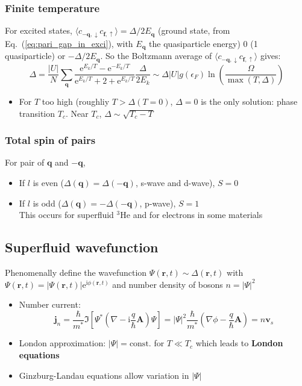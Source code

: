 \documentclass[11pt,letterpaper]{article}
\numberwithin{equation}{section} %
\renewcommand*{\vec}[1]{\bm{#1}}
\newcommand\mi{\mathrm{i}}
\newcommand\e{\mathrm{e}}
\newcommand{\spind}{\ensuremath{\downarrow}}
\newcommand{\spinu}{\ensuremath{\uparrow}}
\begin{document}
\subsubsection{Finite temperature}
\label{ssub:Finite_temperature}
For excited states, $\langle c_{-\vec q,\spind} c_{\vec f,\spinu}\rangle =
\Delta/2E_{\vec q}$ (ground state, from Eq.~(\ref{eq:pari_gap_in_exci}), with
$E_{\vec q}$ the quasiparticle energy) $0$ (1 quasiparticle) or
$-\Delta/2E_{\vec q}$. So the Boltzmann average of $\langle c_{-\vec
q,\spind} c_{\vec f,\spinu}\rangle$ gives: 
\begin{equation}
	\Delta = \frac{|U|}{N}\sum_{\vec q}
	\frac{\e^{E_k/T}-\e^{-E_k/T}}{\e^{E_k/T}+2+\e^{E_k/T}}
	\frac{\Delta}{2E_k}
	\sim \Delta |U|g(\epsilon_F)\ln \left( \frac{\Omega}{\max (T,\Delta)} \right)
\end{equation}
\begin{itemize}
	\item For $T$ too high (roughliy $T>\Delta(T=0)$, $\Delta=0$ is the only
		solution: phase transition $T_c$. Near $T_c$, $\Delta\sim\sqrt{T_c -
		T}$
\end{itemize}

\subsubsection{Total spin of pairs}
\label{ssub:Total_spin_of_pairs}
For pair of $\vec q$ and $-\vec q$, 
\begin{itemize}
	\item If $l$ is even ($\Delta(\vec q) = \Delta(-\vec q)$, s-wave and
		d-wave), $S=0$
	\item If $l$ is odd ($\Delta(\vec q) = -\Delta(-\vec q)$, p-wave),
		$S=1$\\
		This occurs for superfluid $^3$He and for electrons in some materials
\end{itemize}

\subsection{Superfluid wavefunction}
\label{sub:superfluid_wavefunction}
Phenomenally define the wavefunction $\Psi(\vec r, t) \sim \Delta(\vec r, t)$
with $\Psi(\vec r, t) = |\Psi(\vec r, t)|\e^{\mi\phi(\vec r, t)}$ and number
density of bosons $n = |\Psi|^2$
\begin{itemize}
  \item Number current: 
	  \begin{equation}\label{eq:sc_current}
		  \vec j_n = \frac{\hbar}{m^*}\Im \left[ \Psi^* \left( \nabla -
			  \mi\frac q\hbar \vec A \right) \Psi \right] 
			  = |\Psi|^2\frac\hbar{m^*} \left( \nabla\phi - \frac q\hbar \vec
				  A  \right) = n\vec v_s
	  \end{equation}
  \item London approximation: $|\Psi| = \mbox{const.}$ for $T\ll T_c$ which
	  leads to \textbf{London equations}
  \item Ginzburg-Landau equations allow variation in $|\Psi|$
\end{itemize}
\end{document}
